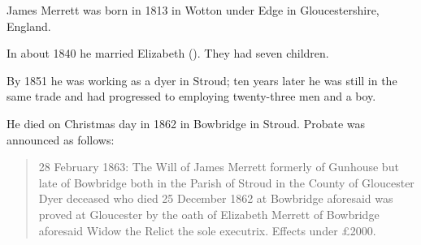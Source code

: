 
James Merrett\cite{HH-MMM-marriage} was born in 1813 in Wotton under Edge in Gloucestershire, England.

In about 1840 he married Elizabeth (). They had seven children.

By 1851 he was working as a dyer in Stroud;\cite{Census1851Merrett}
ten years later he was still in the same trade and had progressed to employing twenty-three men and a boy.\cite{Census1861Merrett}

He died on Christmas day in 1862 in Bowbridge in Stroud. Probate was announced as follows:\cite{JamesMerrettProbate}

\begin{quotation}
28 February 1863: The Will of James Merrett formerly of Gunhouse but late of Bowbridge both in the Parish of Stroud in the County of Gloucester Dyer deceased who died 25 December 1862 at Bowbridge aforesaid was proved at Gloucester by the oath of Elizabeth Merrett of Bowbridge aforesaid Widow the Relict the sole executrix. Effects under \pounds2000.
\end{quotation}
